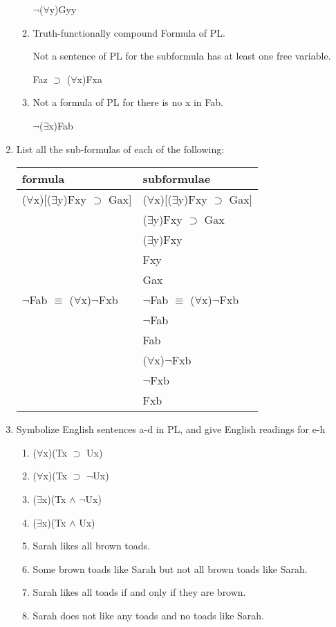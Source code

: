 \documentclass[12pt,letterpaper]{article}
\begin{document}
\begin{enumerate}
\begin{enumerate}
          \underline{$\neg$}($\forall$y)Gyy
        \item
          Truth-functionally compound Formula of PL.

          Not a sentence of PL for the subformula has at least one free variable.

          Faz \underline{$\supset$} ($\forall$x)Fxa
        \item
          Not a formula of PL for there is no x in Fab.

          $\neg$($\exists$x)Fab
      \end{enumerate}

    \item
      List all the sub-formulas of each of the following:

      \begin{tabular}{l l}
        formula & subformulae \\
        \hline
        ($\forall$x)[($\exists$y)Fxy $\supset$ Gax] & ($\forall$x)[($\exists$y)Fxy $\supset$ Gax] \\
        & ($\exists$y)Fxy $\supset$ Gax \\
        & ($\exists$y)Fxy \\
        & Fxy \\
        & Gax \\

        $\neg$Fab $\equiv$ ($\forall$x)$\neg$Fxb & $\neg$Fab $\equiv$ ($\forall$x)$\neg$Fxb \\
        & $\neg$Fab \\
        & Fab \\
        & ($\forall$x)$\neg$Fxb \\
        & $\neg$Fxb \\
        & Fxb \\
      \end{tabular}

    \item
      Symbolize English sentences a-d in PL,
      and give English readings for e-h

      \begin{enumerate}
        \item ($\forall$x)(Tx $\supset$ Ux)
        \item ($\forall$x)(Tx $\supset$ $\neg$Ux)
        \item ($\exists$x)(Tx $\land$ $\neg$Ux)
        \item ($\exists$x)(Tx $\land$ Ux)
        \item Sarah likes all brown toads.
        \item Some brown toads like Sarah but not all brown toads like Sarah.
        \item Sarah likes all toads if and only if they are brown.
        \item Sarah does not like any toads and no toads like Sarah.
      \end{enumerate}


\end{enumerate}
\end{document}
